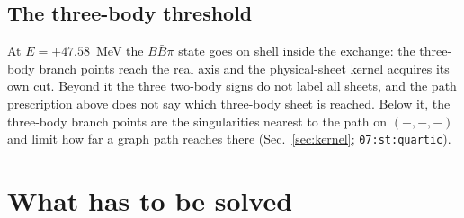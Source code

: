 \documentclass[11pt]{article}
\begin{document}
\subsection{The three-body threshold}\label{sec:threebody}

At $E=+47.58$~MeV the $B\bar B\pi$ state goes on shell inside the exchange: the three-body branch points reach the real axis and the physical-sheet kernel acquires its own cut. Beyond it the three two-body signs do not label all sheets, and the path prescription above does not say which three-body sheet is reached. Below it, the three-body branch points are the singularities nearest to the path on $(-,-,-)$ and limit how far a graph path reaches there (Sec.~\ref{sec:kernel}; \texttt{07:st:quartic}).

\section{What has to be solved}\label{sec:task}
\end{document}
